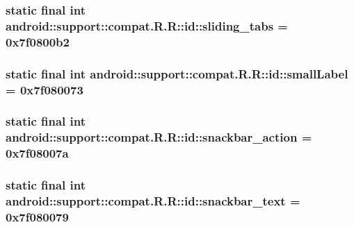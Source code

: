 \hypertarget{classandroid_1_1support_1_1compat_1_1_r_1_1id_9b43130d4790ba76ca699c5e0dc4952b}{
\subsubsection[{sliding\_\-tabs}]{\setlength{\rightskip}{0pt plus 5cm}static final int android::support::compat.R.R::id::sliding\_\-tabs = 0x7f0800b2}}
\label{classandroid_1_1support_1_1compat_1_1_r_1_1id_9b43130d4790ba76ca699c5e0dc4952b}


\hypertarget{classandroid_1_1support_1_1compat_1_1_r_1_1id_aff27c62c1e4a866960c2ed365e41db8}{
\subsubsection[{smallLabel}]{\setlength{\rightskip}{0pt plus 5cm}static final int android::support::compat.R.R::id::smallLabel = 0x7f080073}}
\label{classandroid_1_1support_1_1compat_1_1_r_1_1id_aff27c62c1e4a866960c2ed365e41db8}


\hypertarget{classandroid_1_1support_1_1compat_1_1_r_1_1id_4b46efcf36486a1e9a4aaa8f6bcf6b96}{
\subsubsection[{snackbar\_\-action}]{\setlength{\rightskip}{0pt plus 5cm}static final int android::support::compat.R.R::id::snackbar\_\-action = 0x7f08007a}}
\label{classandroid_1_1support_1_1compat_1_1_r_1_1id_4b46efcf36486a1e9a4aaa8f6bcf6b96}


\hypertarget{classandroid_1_1support_1_1compat_1_1_r_1_1id_2538597395abbe5019b9a477aaca6682}{
\subsubsection[{snackbar\_\-text}]{\setlength{\rightskip}{0pt plus 5cm}static final int android::support::compat.R.R::id::snackbar\_\-text = 0x7f080079}}
\label{classandroid_1_1support_1_1compat_1_1_r_1_1id_2538597395abbe5019b9a477aaca6682}


